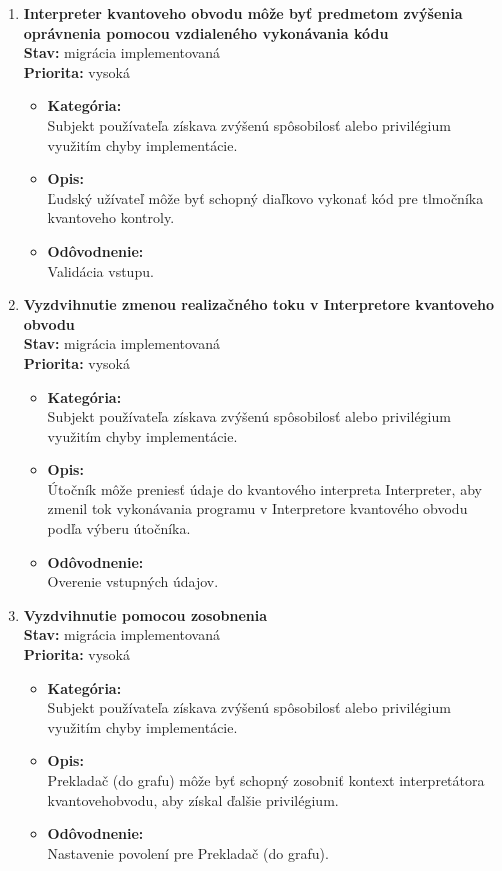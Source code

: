 \begin{enumerate}
\item \textbf{Interpreter kvantoveho obvodu môže byť predmetom zvýšenia oprávnenia pomocou vzdialeného vykonávania kódu} \\
\textbf{Stav:} migrácia implementovaná \\
\textbf{Priorita:} vysoká

\begin{itemize}
\item[] \textbf{Kategória:} \\
Subjekt používateľa získava zvýšenú spôsobilosť alebo privilégium využitím chyby implementácie.
\item[] \textbf{Opis:} \\ 
Ľudský užívateľ môže byť schopný diaľkovo vykonať kód pre tlmočníka kvantoveho kontroly.
\item[] \textbf{Odôvodnenie:} \\ 
Validácia vstupu.
\end{itemize}

\item \textbf{Vyzdvihnutie zmenou realizačného toku v Interpretore kvantoveho obvodu}  \\
\textbf{Stav:} migrácia implementovaná \\
\textbf{Priorita:} vysoká

\begin{itemize}
\item[] \textbf{Kategória:}  \\
Subjekt používateľa získava zvýšenú spôsobilosť alebo privilégium využitím chyby implementácie.
\item[] \textbf{Opis:} \\ 
Útočník môže preniesť údaje do kvantového interpreta Interpreter, aby zmenil tok vykonávania programu v Interpretore kvantového obvodu podľa výberu útočníka.
\item[] \textbf{Odôvodnenie:} \\ 
Overenie vstupných údajov.
\end{itemize}

\item \textbf{Vyzdvihnutie pomocou zosobnenia} \\ 
\textbf{Stav:} migrácia implementovaná \\
\textbf{Priorita:} vysoká

\begin{itemize}
\item[] \textbf{Kategória:} \\
Subjekt používateľa získava zvýšenú spôsobilosť alebo privilégium využitím chyby implementácie.
\item[] \textbf{Opis:} \\
Prekladač (do grafu) môže byť schopný zosobniť kontext interpretátora kvantovehobvodu, aby získal ďalšie privilégium.
\item[] \textbf{Odôvodnenie:} \\
Nastavenie povolení pre Prekladač (do grafu).
\end{itemize}

\end{enumerate}

